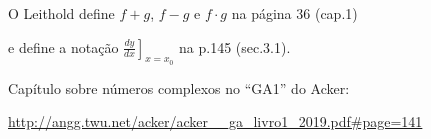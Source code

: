 \documentclass[oneside,12pt]{article}
\begin{document}
{{\msk

O Leithold define $f+g$, $f-g$ e $f·g$ na página 36 (cap.1)

e define a notação $\left. \frac{dy}{dx} \right]_{x=x_0}$ na p.145 (sec.3.1).


\msk


Capítulo sobre números complexos no ``GA1'' do Acker:

{\scriptsize

\url{http://angg.twu.net/acker/acker__ga_livro1_2019.pdf\#page=141}


}

}\anothercol{
}}


\newpage
\end{document}
